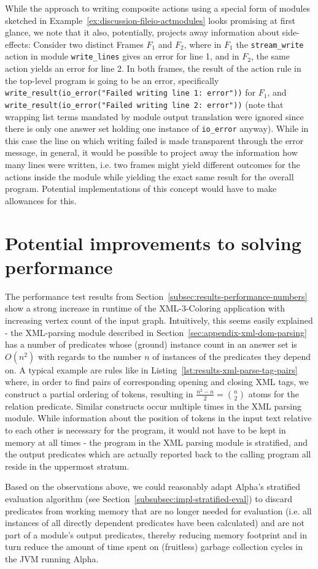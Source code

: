 While the approach to writing composite actions using a special form of modules sketched in Example~\ref{ex:discussion-fileio-actmodules} looks promising at first glance, we note that it also, potentially, projects away information about side-effects: Consider two distinct Frames $F_1$ and $F_2$, where in $F_1$ the \texttt{stream\_write} action in module \texttt{write\_lines} gives an error for line 1, and in $F_2$, the same action yields an error for line 2. In both frames, the result of the action rule in the top-level program is going to be an error, specifically \texttt{write\_result(io\_error("Failed writing line 1: error"))} for $F_1$, and \texttt{write\_result(io\_error("Failed writing line 2: error"))} (note that wrapping list terms mandated by module output translation were ignored since there is only one answer set holding one instance of \texttt{io\_error} anyway). While in this case the line on which writing failed is made transparent through the error message, in general, it would be possible to project away the information how many lines were written, i.e. two frames might yield different outcomes for the actions inside the module while yielding the exact same result for the overall program. Potential implementations of this concept would have to make allowances for this.


\section{Potential improvements to solving performance}

The performance test results from Section~\ref{subsec:results-performance-numbers} show a strong increase in runtime of the XML-3-Coloring application with increasing vertex count of the input graph. Intuitively, this seems easily explained - the XML-parsing module described in Section~\ref{sec:appendix-xml-dom-parsing} has a number of predicates whose (ground) instance count in an answer set is $O(n^2)$ with regards to the number $n$ of instances of the predicates they depend on. A typical example are rules like in Listing~\ref{lst:results-xml-parse-tag-pairs} where, in order to find pairs of corresponding opening and closing XML tags, we construct a partial ordering of tokens, resulting in $\frac{n^2 - n}{2} = \binom{n}{2}$ atoms for the relation predicate. Similar constructs occur multiple times in the XML parsing module. While information about the position of tokens in the input text relative to each other is necessary for the program, it would not have to be kept in memory at all times - the program in the XML parsing module is stratified, and the output predicates which are actually reported back to the calling program all reside in the uppermost stratum.

Based on the observations above, we could reasonably adapt Alpha's stratified evaluation algorithm (see Section~\ref{subsubsec:impl-stratified-eval}) to discard predicates from working memory that are no longer needed for evaluation (i.e. all instances of all directly dependent predicates have been calculated) and are not part of a module's output predicates, thereby reducing memory footprint and in turn reduce the amount of time spent on (fruitless) garbage collection cycles in the JVM running Alpha.